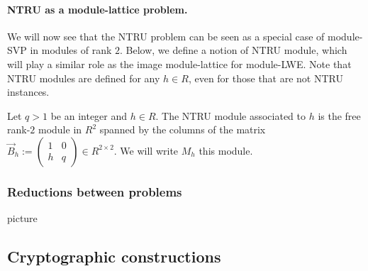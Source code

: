 
\paragraph{NTRU as a module-lattice problem.} We will now see that the NTRU problem can be seen as a special case of module-SVP in modules of rank $2$. Below, we define a notion of NTRU module, which will play a similar role as the image module-lattice for module-LWE. Note that NTRU modules are defined for any $h \in R$, even for those that are not NTRU instances.

\begin{definition}
Let $q > 1$ be an integer and $h \in R$. The NTRU module associated to $h$ is the free rank-$2$ module in $R^2$ spanned by the columns of the matrix
$\vec B_h := \begin{pmatrix}
1 & 0 \\
h & q
\end{pmatrix} \in R^{2 \times 2}$.
We will write $M_h$ this module.
\end{definition}



\subsubsection{Reductions between problems}

picture


\subsection{Cryptographic constructions}
\label{sec:constructions}

